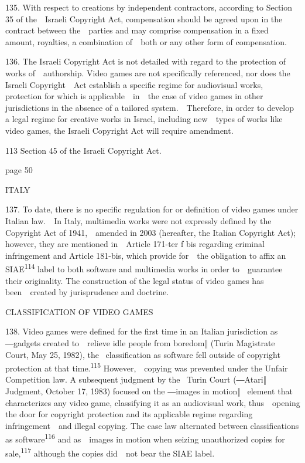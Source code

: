 \documentclass[
]{article}
\begin{document}
{135. }{With respect to creations by independent contractors, according
to Section 35 of the~~Israeli }{Copyright Act}{, compensation should be
agreed upon in the contract between the~~parties and may comprise
compensation in a fixed amount, royalties, a combination of~~both or any
other form of compensation.}

{136. }{The Israeli }{Copyright Act }{is not detailed with regard to the
protection of works of~~authorship. Video games are not specifically
referenced, nor does the Israeli }{Copyright~~Act }{establish a specific
regime for audiovisual works, protection for which is
applicable~~in~~the case of video games in other jurisdictions in the
absence of a tailored system.~~Therefore, in order to develop a legal
regime for creative works in Israel, including new~~types of works like
video games, the Israeli }{Copyright Act }{will require amendment.}

{113 }{Section 45 of the Israeli }{Copyright Act}{.}

{page 50}

{ITALY}

{137. }{To date, there is no specific regulation for or definition of
video games under Italian law.~~In Italy, multimedia works were not
expressly defined by the }{Copyright Act of 1941}{,~~amended in 2003
(hereafter, the Italian }{Copyright Act}{); however, they are mentioned
in~~Article 171-}{ter }{f }{bis }{regarding criminal infringement and
Article 181-}{bis}{, which provide for~~the obligation to affix an
SIAE}\textsuperscript{{114 }}{label to both software and multimedia
works in order to~~guarantee their originality. The construction of the
legal status of video games has been~~created by jurisprudence and
doctrine.}

{CLASSIFICATION OF VIDEO GAMES}

{138. }{Video games were defined for the first time in an Italian
jurisdiction as ―}{gadgets created to~~relieve idle people from
boredom}{‖ (Turin Magistrate Court, May 25, 1982), the }{~classification
as software fell outside of copyright protection at that
time.}\textsuperscript{{115 }}{However,~~copying was prevented under the
}{Unfair Competition }{law. A subsequent judgment by the }{~Turin Court
(―Atari‖ Judgment, October 17, 1983) focused on the ―images in motion‖
}{~element that characterizes any video game, classifying it as an
audiovisual work, thus~~opening the door for copyright protection and
its applicable regime regarding infringement~~and illegal copying. The
case law alternated between classifications as
software}\textsuperscript{{116 }}{and as~~images in motion when seizing
unauthorized copies for sale,}\textsuperscript{{117 }}{although the
copies did~~not bear the SIAE label.}
\end{document}
